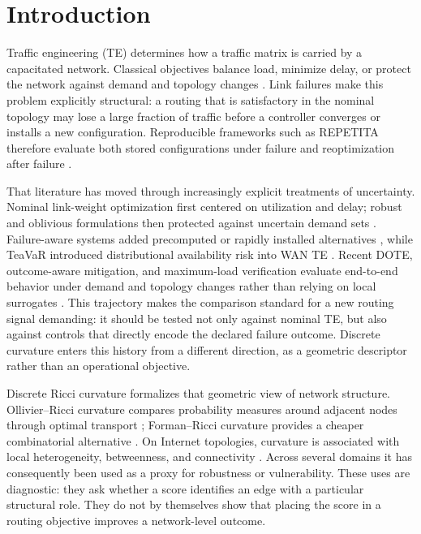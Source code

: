 \documentclass[preprint,12pt]{elsarticle}
\begin{document}
\section{Introduction}

Traffic engineering (TE) determines how a traffic matrix is carried by a
capacitated network. Classical objectives balance load, minimize delay, or
protect the network against demand and topology changes
\cite{fortz2000,liu2014ffc}. Link failures make this problem explicitly
structural: a routing that is satisfactory in the nominal topology may lose a
large fraction of traffic before a controller converges or installs a new
configuration. Reproducible frameworks such as REPETITA therefore evaluate both
stored configurations under failure and reoptimization after failure
\cite{gay2017repetita}.

That literature has moved through increasingly explicit treatments of
uncertainty. Nominal link-weight optimization first centered on utilization and
delay; robust and oblivious formulations then protected against uncertain
demand sets \cite{applegate2003robust,wang2006cope}. Failure-aware systems added
precomputed or rapidly installed alternatives \cite{wang2010r3,liu2014ffc},
while TeaVaR introduced distributional availability risk into WAN TE
\cite{bogle2019teavar}. Recent DOTE, outcome-aware mitigation, and maximum-load
verification evaluate end-to-end behavior under demand and topology changes
rather than relying on local surrogates
\cite{perry2023dote,namyar2025mitigation,schneider2025loads}. This trajectory
makes the comparison standard for a new routing signal demanding: it should be
tested not only against nominal TE, but also against controls that directly
encode the declared failure outcome. Discrete curvature enters this history
from a different direction, as a geometric descriptor rather than an
operational objective.

Discrete Ricci curvature formalizes that geometric view of network structure.
Ollivier--Ricci curvature compares probability measures around adjacent nodes
through optimal transport \cite{ollivier2009}; Forman--Ricci curvature provides
a cheaper combinatorial alternative \cite{forman2003,samal2018}. On Internet
topologies, curvature is associated with local heterogeneity, betweenness, and
connectivity \cite{ni2015}. Across several domains it has consequently been
used as a proxy for robustness or vulnerability. These uses are diagnostic:
they ask whether a score identifies an edge with a particular structural role.
They do not by themselves show that placing the score in a routing objective
improves a network-level outcome.
\end{document}
